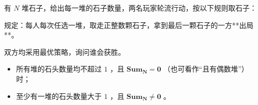 有 $N$ 堆石子，给出每一堆的石子数量，两名玩家轮流行动，按以下规则取石子：

规定：每人每次任选一堆，取走正整数颗石子，拿到最后一颗石子的一方**出局**。

双方均采用最优策略，询问谁会获胜。

\begin{itemize}
    \item 所有堆的石头数量均不超过 $1$ ，且 $\pmb {Sum_N=0}$ （也可看作“且有偶数堆”）时；
    \item 至少有一堆的石头数量大于 $1$ ，且 $\pmb{Sum_N \neq 0}$ 。
\end{itemize}
